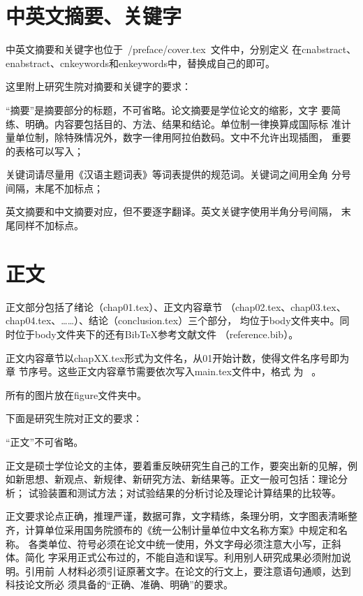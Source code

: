 \section{中英文摘要、关键字}
中英文摘要和关键字也位于~{/preface/cover.tex}~文件中，分别定义
在cnabstract、 enabstract、cnkeywords和enkeywords中，替换成自己的即可。

这里附上研究生院对摘要和关键字的要求：
\begin{asparaenum}
\item “摘要”是摘要部分的标题，不可省略。论文摘要是学位论文的缩影，文字
  要简练、明确。内容要包括目的、方法、结果和结论。单位制一律换算成国际标
  准计量单位制，除特殊情况外，数字一律用阿拉伯数码。文中不允许出现插图，
  重要的表格可以写入；
\item 关键词请尽量用《汉语主题词表》等词表提供的规范词。关键词之间用全角
  分号间隔，末尾不加标点；
\item 英文摘要和中文摘要对应，但不要逐字翻译。英文关键字使用半角分号间隔，
  末尾同样不加标点。
\end{asparaenum}

\section{正文}

正文部分包括了绪论（chap01.tex）、正文内容章节
（chap02.tex、chap03.tex、chap04.tex、……）、结论（conclusion.tex）三个部分，
均位于body文件夹中。同时位于body文件夹下的还有Bib\TeX{}参考文献文件
（reference.bib）。

正文内容章节以chapXX.tex形式为文件名，从01开始计数，使得文件名序号即为章
节序号。这些正文内容章节需要依次写入main.tex文件中，格式
为~\verb|| 。

所有的图片放在figure文件夹中。

下面是研究生院对正文的要求：

“正文”不可省略。

正文是硕士学位论文的主体，要着重反映研究生自己的工作，要突出新的见解，例
如新思想、新观点、新规律、新研究方法、新结果等。正文一般可包括：理论分析；
试验装置和测试方法；对试验结果的分析讨论及理论计算结果的比较等。

正文要求论点正确，推理严谨，数据可靠，文字精练，条理分明，文字图表清晰整
齐，计算单位采用国务院颁布的《统一公制计量单位中文名称方案》中规定和名称。
各类单位、符号必须在论文中统一使用，外文字母必须注意大小写，正斜体。简化
字采用正式公布过的，不能自造和误写。利用别人研究成果必须附加说明。引用前
人材料必须引证原著文字。在论文的行文上，要注意语句通顺，达到科技论文所必
须具备的“正确、准确、明确”的要求。

